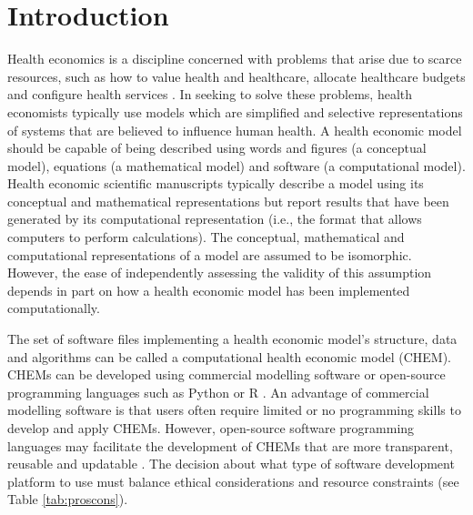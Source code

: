 \documentclass[sn-vancouver,Numbered,pdflatex]{sn-jnl}
\theoremstyle{remark}
\theoremstyle{definition}
\begin{document}
\hypertarget{introduction}{%
\section{Introduction}\label{introduction}}

Health economics is a discipline concerned with problems that arise due to scarce resources, such as how to value health and healthcare, allocate healthcare budgets and configure health services \citep{wagstaff2012four}. In seeking to solve these problems, health economists typically use models which are simplified and selective representations of systems that are believed to influence human health. A health economic model should be capable of being described using words and figures (a conceptual model), equations (a mathematical model) and software (a computational model). Health economic scientific manuscripts typically describe a model using its conceptual and mathematical representations but report results that have been generated by its computational representation (i.e., the format that allows computers to perform calculations). The conceptual, mathematical and computational representations of a model are assumed to be isomorphic. However, the ease of independently assessing the validity of this assumption depends in part on how a health economic model has been implemented computationally.

The set of software files implementing a health economic model's structure, data and algorithms can be called a computational health economic model (CHEM). CHEMs can be developed using commercial modelling software or open-source programming languages such as Python \citep{python2009} or R \citep{RCORE2022}. An advantage of commercial modelling software is that users often require limited or no programming skills to develop and apply CHEMs. However, open-source software programming languages may facilitate the development of CHEMs that are more transparent, reusable and updatable \citep{incerti2019r, Pouwels2022}. The decision about what type of software development platform to use must balance ethical considerations and resource constraints (see Table \ref{tab:proscons}).
\end{document}
